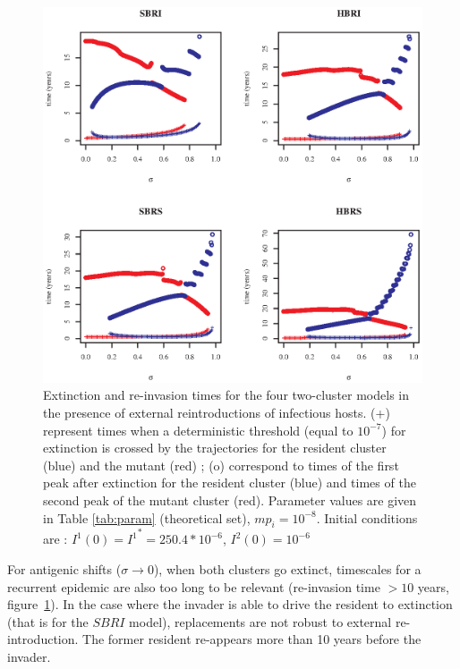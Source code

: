 \begin{figure}[!htbp]
\begin{center}
	\includegraphics[]{graphs/article1/figure_6.eps}
\end{center}
	\caption{ Extinction and re-invasion times for the four
          two-cluster models in the presence of external
          reintroductions of infectious hosts. (+) represent times
          when a deterministic threshold (equal to $10^{-7}$) for
          extinction is crossed by the trajectories for the resident
          cluster (blue) and the mutant (red) ; (o) correspond to
          times of the first peak after extinction for the resident
          cluster (blue) and times of the second peak of the mutant
          cluster (red). Parameter values are given in Table
          \ref{tab:param} (theoretical set), $mp_i=10^{-8}$. Initial
          conditions are : ${I^1}(0) = {I^1}^*=250.4*10^{-6}$,
          ${I^2}(0)=10^{-6}$}
\label{fig:time}
\end{figure}


For antigenic shifts ($\sigma \to 0$), when both clusters go extinct,
timescales for a recurrent epidemic are also too long to be relevant
(re-invasion time $>10$ years, figure~\ref{fig:time}). In the case
where the invader is able to drive the resident to extinction (that is
for the $SBRI$ model), replacements are not robust to external
re-introduction. The former resident re-appears more than 10 years
before the invader.

